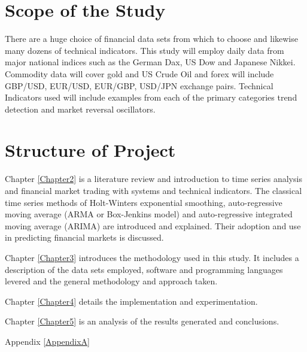 \section{Scope of the Study }
There are a huge choice of financial data sets from which to choose and likewise many dozens of technical indicators. This study will employ daily data from major national indices such as the German Dax, US Dow and Japanese Nikkei. Commodity data will cover gold and US Crude Oil and forex will include GBP/USD, EUR/USD, EUR/GBP, USD/JPN exchange pairs. Technical Indicators used will include examples from each of the primary categories trend detection and market reversal oscillators.

\section{Structure of Project}
Chapter \ref{Chapter2} is a literature review and introduction to time series analysis and financial market trading with systems and technical indicators. The classical time series methods of Holt-Winters exponential smoothing, auto-regressive moving average (ARMA or Box-Jenkins model) and auto-regressive integrated moving average (ARIMA) are introduced and explained. Their adoption and use in predicting financial markets is discussed.

Chapter \ref{Chapter3} introduces the methodology used in this study. It includes a description of the data sets employed, software and programming languages levered and the general methodology and approach taken.

Chapter \ref{Chapter4} details the implementation and experimentation.

Chapter \ref{Chapter5} is an analysis of the results generated and conclusions.

Appendix \ref{AppendixA}

